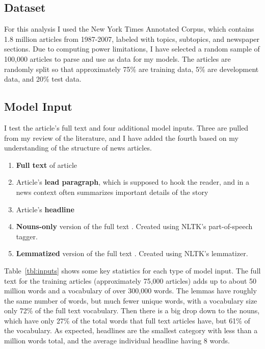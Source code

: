 \documentclass[11pt,a4paper,table]{article}
\begin{document}
\subsection{Dataset}
\label{ssec:dataset}

For this analysis I used the New York Times Annotated Corpus, which contains 1.8 million articles from 1987-2007, labeled with topics, subtopics, and newspaper sections. Due to computing power limitations, I have selected a random sample of 100,000 articles to parse and use as data for my models. The articles are randomly split so that approximately 75\% are training data, 5\% are development data, and 20\% test data.

\subsection{Model Input}
\label{ssec:input}

I test the article's full text and four additional model inputs. Three are pulled from my review of the literature,  and I have added the fourth based on my understanding of the structure of news articles.

\begin{enumerate}
\item \textbf{Full text} of article
\item Article's \textbf{lead paragraph}, which is supposed to hook the reader, and in a news context often summarizes important details of the story \cite{NPR}
\item Article's \textbf{headline} \cite{Wermter:02}
\item \textbf{Nouns-only} version of the full text \cite{Martin:15}. Created using NLTK's part-of-speech tagger.
\item \textbf{Lemmatized} version of the full text \cite{Martin:15}. Created using NLTK's lemmatizer.
\end{enumerate}

Table~\ref{tbl:inputs} shows some key statistics for each type of model input. The full text for the training articles (approximately 75,000 articles) adds up to about 50 million words and a vocabulary of over 300,000 words. The lemmas have roughly the same number of words, but much fewer unique words, with a vocabulary size only 72\% of the full text vocabulary. Then there is a big drop down to the nouns, which have only 27\% of the total words that full text articles have, but 61\% of the vocabulary. As expected, headlines are the smallest category with less than a million words total, and the average individual headline having 8 words.
\end{document}
